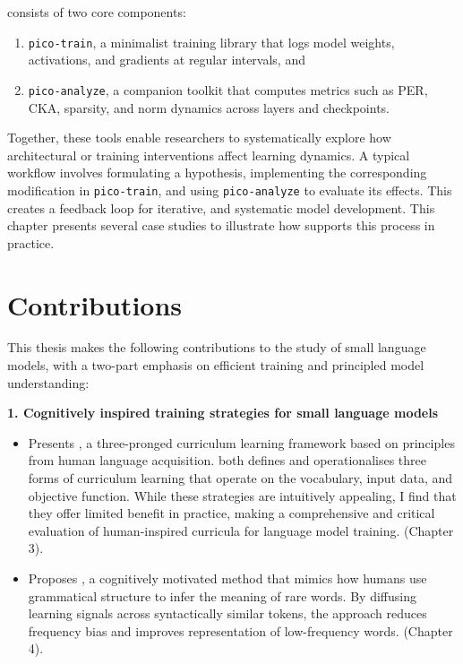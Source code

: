 \begin{itemize}
    \pico consists of two core components:
    
    \begin{enumerate}
        \item \texttt{pico-train}, a minimalist training library that logs model weights, activations, and gradients at regular intervals, and
        
        \item \texttt{pico-analyze}, a companion toolkit that computes metrics such as PER, CKA, sparsity, and norm dynamics across layers and checkpoints.
    \end{enumerate}

    Together, these tools enable researchers to systematically explore how architectural or training interventions affect learning dynamics. A typical workflow involves formulating a hypothesis, implementing the corresponding modification in \texttt{pico-train}, and using \texttt{pico-analyze} to evaluate its effects. This creates a feedback loop for iterative, and systematic model development. This chapter presents several case studies to illustrate how \pico supports this process in practice.

\end{itemize}

\section*{Contributions}

This thesis makes the following contributions to the study of small language models, with a two-part emphasis on efficient training and principled model understanding:

\vspace{1em}

\textbf{1. Cognitively inspired training strategies for small language models}

\begin{itemize}

    \item Presents \climb, a three-pronged curriculum learning framework based on principles from human language acquisition. \climb both defines and operationalises three forms of curriculum learning that operate on the vocabulary, input data, and objective function. While these strategies are intuitively appealing, I find that they offer limited benefit in practice, making \climb a comprehensive and critical evaluation of human-inspired curricula for language model training. (Chapter 3).

    \item Proposes \smoothing, a cognitively motivated method that mimics how humans use grammatical structure to infer the meaning of rare words. By diffusing learning signals across syntactically similar tokens, the approach reduces frequency bias and improves representation of low-frequency words. (Chapter 4).

\end{itemize}

